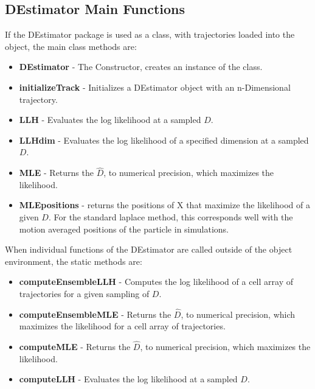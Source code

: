 \documentclass{article}
\begin{document}
\subsection{DEstimator Main Functions}
If the DEstimator package is used as a class, with trajectories loaded into the object, the main class methods are:
\begin{itemize}
    \item \textbf{DEstimator} - The Constructor, creates an instance of the class.
    \item \textbf{initializeTrack} - Initializes a DEstimator object with an n-Dimensional trajectory.
    \item \textbf{LLH} - Evaluates the log likelihood at a sampled $D$.
    \item \textbf{LLHdim} - Evaluates the log likelihood of a specified dimension at a sampled $D$.
    \item \textbf{MLE} - Returns the $\hat{D}$, to numerical precision, which maximizes the likelihood.
    \item \textbf{MLEpositions} - returns the positions of X that maximize the likelihood of a given $D$.  For the standard laplace method, this corresponds well with the motion averaged positions of the particle in simulations.
\end{itemize}
When individual functions of the DEstimator are called outside of the object environment, the static methods are:
\begin{itemize}
    \item \textbf{computeEnsembleLLH} - Computes the log likelihood of a cell array of trajectories for a given sampling of $D$.
    \item \textbf{computeEnsembleMLE} - Returns the $\hat{D}$, to numerical precision, which maximizes the likelihood for a cell array of trajectories.
    \item \textbf{computeMLE} - Returns the $\hat{D}$, to numerical precision, which maximizes the likelihood.
    \item \textbf{computeLLH} - Evaluates the log likelihood at a sampled $D$.
\end{itemize}
\end{document}

